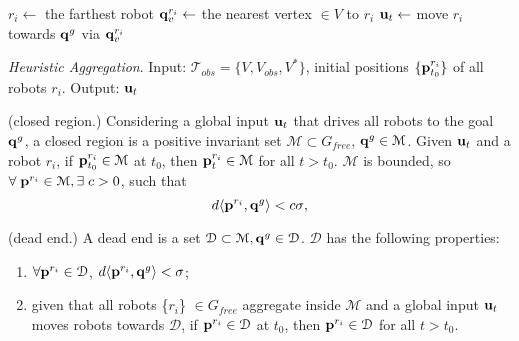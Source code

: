 \begin{algorithm}[h]
	\begin{algorithmic}[1]
		\STATE $r_i \leftarrow $ the farthest robot
		\STATE ${\bf q}^{r_i}_v \leftarrow $ the nearest vertex $\in V$ to $r_i$ 	
		\STATE ${\bf u}_t \leftarrow$ move  $r_i$ towards ${\bf q}^g$ via ${\bf q}^{r_i}_v $
		\ENDWHILE
	\end{algorithmic}
	\caption{\textit {Heuristic Aggregation}. Input: $\mathcal{T}_{obs} = \{V, V_{obs}, V^*\}$,  initial positions $\{ {\bf p}^{r_i}_{t_0}\}$ of all robots $r_i$. Output: ${\bf u}_t$   }
	\label{alg:Heuristics}
\end{algorithm}



\begin{definition}\label{def:closeregion}
	{\normalfont (closed region.)} Considering a global input ${\bf u}_t$ that drives all robots to the goal ${\bf q}^g$, a closed region is a positive invariant set $\mathcal{M} \subset G_{free}$, ${\bf q}^g \in \mathcal{M}$.  Given ${\bf u}_t$ and a robot $r_i$, if ${\bf p}^{r_i}_{t_0} \in \mathcal{M}$ at $t_0$, then ${\bf p}^{r_i}_t\in \mathcal{M}$ for all $t>t_0$. $\mathcal{M}$ is bounded, so $\forall\; {\bf p}^{r_i} \in \mathcal{M}, \exists\;c>0$, such that
	\begin{equation}
	d\langle {\bf p}^{r_i}, {\bf q}^g \rangle< {c\sigma}, 
	\end{equation}

\end{definition}

\begin{definition}\label{def:deadend}
	{\normalfont (dead end.)} A dead end is a set $\mathcal{D}\subset \mathcal{M}, {\bf q}^g \in \mathcal{D}$. $\mathcal{D}$ has the following properties: 
	\begin{enumerate}
		\item $\forall {\bf p}^{r_i} \in \mathcal{D}$, $d\langle {\bf p}^{r_i}, {\bf q}^g \rangle< {\sigma}$;
		\item given that all robots \{$r_i$\} $\in G_{free}$ aggregate inside $\mathcal{M}$ and a global input ${\bf u}_t$ moves robots towards $\mathcal{D}$, if ${\bf p}^{r_i} \in \mathcal{D}$ at $t_0$, then ${\bf p}^{r_i}\in \mathcal{D}$ for all $t>t_0$.   
	\end{enumerate}
\end{definition}

